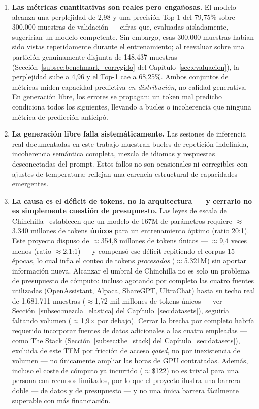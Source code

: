 \begin{enumerate}
    \item \textbf{Las métricas cuantitativas son reales pero engañosas.} El modelo alcanza una perplejidad de 2,98 y una precisión Top-1 del 79,75\% sobre 300.000 muestras de validación --- cifras que, evaluadas aisladamente, sugerirían un modelo competente. Sin embargo, esas 300.000 muestras habían sido vistas repetidamente durante el entrenamiento; al reevaluar sobre una partición genuinamente disjunta de 148.437 muestras (Sección~\ref{subsec:benchmark_corregido} del Capítulo~\ref{sec:evaluacion}), la perplejidad sube a 4,96 y el Top-1 cae a 68,25\%. Ambos conjuntos de métricas miden capacidad predictiva \textit{en distribución}, no calidad generativa. En generación libre, los errores se propagan: un token mal predicho condiciona todos los siguientes, llevando a bucles o incoherencia que ninguna métrica de predicción anticipó.

    \item \textbf{La generación libre falla sistemáticamente.} Las sesiones de inferencia real documentadas en este trabajo muestran bucles de repetición indefinida, incoherencia semántica completa, mezcla de idiomas y respuestas desconectadas del prompt. Estos fallos no son ocasionales ni corregibles con ajustes de temperatura: reflejan una carencia estructural de capacidades emergentes.

    \item \textbf{La causa es el déficit de tokens, no la arquitectura --- y cerrarlo no es simplemente cuestión de presupuesto.} Las leyes de escala de Chinchilla~\cite{hoffmann2022chinchilla} establecen que un modelo de 167M de parámetros requiere $\approx$3.340 millones de tokens \textbf{únicos} para un entrenamiento óptimo (ratio 20:1). Este proyecto dispuso de $\approx$354,8 millones de tokens únicos --- $\approx$9,4 veces menos (ratio $\approx$2,1:1) --- y compensó ese déficit repitiendo el corpus 15 épocas, lo cual infla el conteo de tokens \textit{procesados} ($\approx$5.321M) sin aportar información nueva. Alcanzar el umbral de Chinchilla no es solo un problema de presupuesto de cómputo: incluso agotando por completo las cuatro fuentes utilizadas (OpenAssistant, Alpaca, ShareGPT, UltraChat) hasta su techo real de 1.681.711 muestras ($\approx$1,72 mil millones de tokens únicos --- ver Sección~\ref{subsec:mezcla_elastica} del Capítulo~\ref{sec:datasets}), seguiría faltando volumen ($\approx$1,9$\times$ por debajo). Cerrar la brecha por completo habría requerido incorporar fuentes de datos adicionales a las cuatro empleadas --- como The Stack (Sección~\ref{subsec:the_stack} del Capítulo~\ref{sec:datasets}), excluida de este TFM por fricción de acceso \textit{gated}, no por inexistencia de volumen --- no únicamente ampliar las horas de GPU contratadas. Además, incluso el coste de cómputo ya incurrido ($\approx$\$122) no es trivial para una persona con recursos limitados, por lo que el proyecto ilustra una barrera doble --- de datos y de presupuesto --- y no una única barrera fácilmente superable con más financiación.


\end{enumerate}
